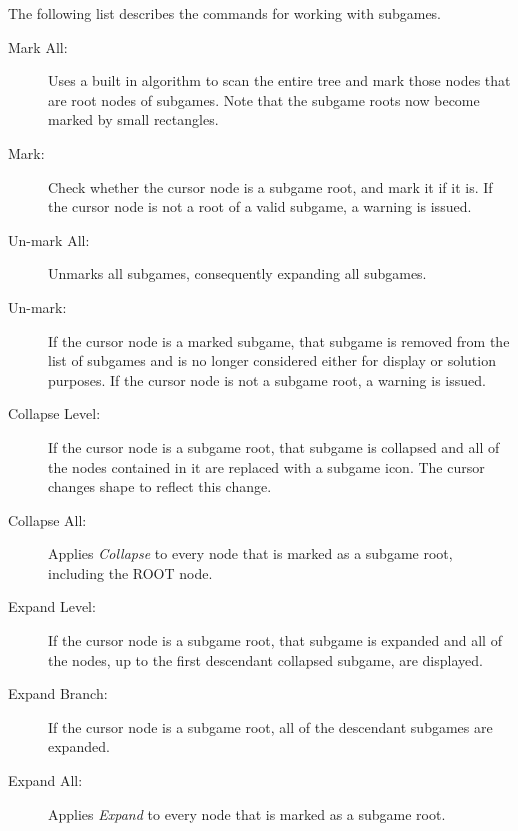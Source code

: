 The following list describes the commands for working with subgames. 
\begin{description}
\item[Mark All:] Uses a built in algorithm to scan the entire tree and mark
those nodes that are root nodes of subgames.  Note that the subgame roots
now become marked by small rectangles.
\item[Mark:] Check whether the cursor node is a subgame root, and mark 
it if it is.  If the cursor node is 
not a root of a valid subgame, a warning is issued. 
\item[Un-mark All:] Unmarks all subgames, consequently expanding all
subgames.
\item[Un-mark:] If the cursor node is a marked subgame, that subgame is removed
from the list of subgames and is no longer considered either for display or
solution purposes.  If the cursor node is not a subgame root, a warning is
issued.
\item[Collapse Level:] If the cursor node is a subgame root, that subgame is 
collapsed and all of the nodes contained in it are replaced with a subgame 
icon.  The cursor changes shape to reflect this change.
\item[Collapse All:] Applies {\em Collapse} to every node that is marked as a 
subgame root, including the ROOT node.
\item[Expand Level:] If the cursor node is a subgame root, that subgame is expanded
and all of the nodes, up to the first descendant collapsed subgame,
are displayed.
\item[Expand Branch:] If the cursor node is a subgame root, all of the
descendant subgames are expanded.
\item[Expand All:] Applies {\em Expand} to every node that is marked as a 
subgame root.
\end{description}


